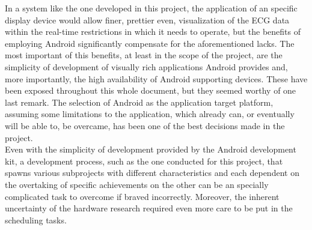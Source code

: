 		In a system like the one developed in this project, the application of an specific display device would allow finer, prettier even, visualization of the ECG data within the real-time restrictions in which it needs to operate, but the benefits of employing Android significantly compensate for the aforementioned lacks. The most important of this benefits, at least in the scope of the project, are the simplicity of development of visually rich applications Android provides and, more importantly, the high availability of Android supporting devices. These have been exposed throughout this whole document, but they seemed worthy of one last remark. The selection of Android as the application target platform, assuming some limitations to the application, which already can, or eventually will be able to, be overcame, has been one of the best decisions made in the project.\\

		Even with the simplicity of development provided by the Android development kit, a development process, such as the one conducted for this project, that spawns various subprojects with different characteristics and each dependent on the overtaking of specific achievements on the other can be an specially complicated task to overcome if braved incorrectly. Moreover, the inherent uncertainty of the hardware research required even more care to be put in the scheduling tasks.\\

